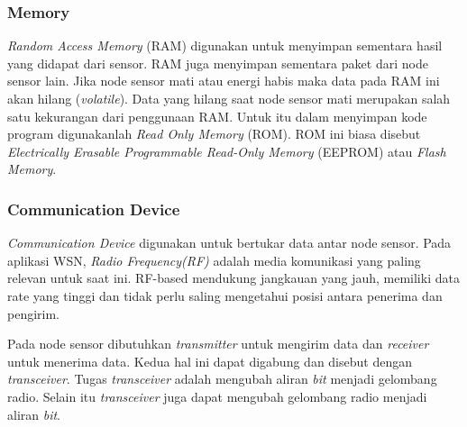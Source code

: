 \subsubsection{Memory}
\textit{Random Access Memory} (RAM) digunakan untuk menyimpan sementara hasil yang didapat dari sensor. RAM juga menyimpan sementara paket dari node sensor lain. Jika node sensor mati atau energi habis maka data pada RAM ini akan hilang (\textit{volatile}). Data yang hilang saat node sensor mati merupakan salah satu kekurangan dari penggunaan RAM. Untuk itu dalam menyimpan kode program digunakanlah \textit{Read Only Memory} (ROM). ROM ini biasa disebut \textit{Electrically Erasable Programmable Read-Only Memory} (EEPROM) atau \textit{Flash Memory}.

\subsubsection{Communication Device}
\textit{Communication Device} digunakan untuk bertukar data antar node sensor. Pada aplikasi WSN, \textit{Radio Frequency(RF)} adalah media komunikasi yang paling relevan untuk saat ini. RF-based mendukung jangkauan yang jauh, memiliki data rate yang tinggi dan tidak perlu saling mengetahui posisi antara penerima dan pengirim.

Pada node sensor dibutuhkan \textit{transmitter} untuk mengirim data dan \textit{receiver} untuk menerima data. Kedua hal ini dapat digabung dan disebut dengan \textit{transceiver}. Tugas \textit{transceiver} adalah mengubah aliran \textit{bit} menjadi gelombang radio. Selain itu \textit{transceiver} juga dapat mengubah gelombang radio menjadi aliran \textit{bit}.

